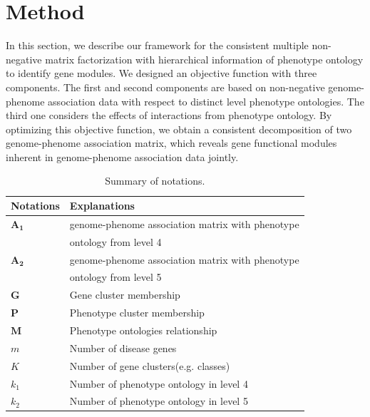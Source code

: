 \documentclass{bmcart}
\begin{document}

\section*{Method}
In this section, we describe our framework for the consistent multiple non-negative matrix
factorization with hierarchical information of phenotype ontology to identify gene modules.
We designed an objective function with three components. The first and second components are based on non-negative genome-phenome association data with respect to distinct level phenotype ontologies. The third one considers the effects of interactions from phenotype ontology. By optimizing this objective function, we obtain a consistent decomposition of two genome-phenome association matrix, which reveals gene functional modules inherent in genome-phenome association data jointly.
\begin{table}[t!]
 \caption{Summary of notations.}\label{Tab:Notations}
\begin{tabular}{|l|l|}
    \hline
    Notations & Explanations\\
    \hline\hline
    $\bm{A_1}$ & genome-phenome association matrix with phenotype\\
    & ontology from level 4\\
    $\bm{A_2}$ & genome-phenome association matrix with phenotype\\
    & ontology from level 5\\
    $\bm{G}$ & Gene cluster membership\\
    $\bm{P}$ & Phenotype cluster membership\\
    $\bm{M}$ & Phenotype ontologies relationship\\
    $m$ & Number of disease genes\\
    $K$ & Number of gene clusters(e.g. classes)\\
    $k_1$ & Number of phenotype ontology in level 4\\
    $k_2$ & Number of phenotype ontology in level 5\\
    \hline
  \end{tabular}
\end{table}
\end{document}
